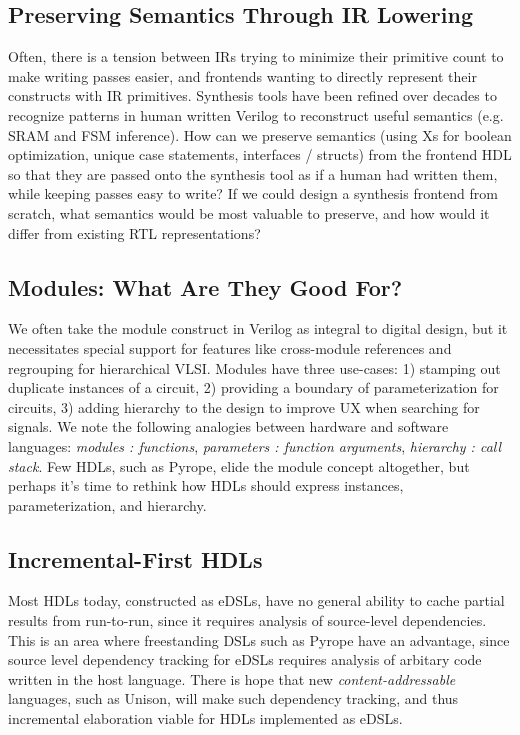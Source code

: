 \documentclass[sigplan,review,nonacm,10pt]{acmart}
\begin{document}
\subsection{Preserving Semantics Through IR Lowering}


Often, there is a tension between IRs trying to minimize their primitive count to make writing passes easier, and frontends wanting to directly represent their constructs with IR primitives.
Synthesis tools have been refined over decades to recognize patterns in human written Verilog to reconstruct useful semantics (e.g. SRAM and FSM inference).
How can we preserve semantics (using Xs for boolean optimization, unique case statements, interfaces / structs) from the frontend HDL so that they are passed onto the synthesis tool as if a human had written them, while keeping passes easy to write?
If we could design a synthesis frontend from scratch, what semantics would be most valuable to preserve, and how would it differ from existing RTL representations?

\subsection{Modules: What Are They Good For?}

We often take the module construct in Verilog as integral to digital design, but it necessitates special support for features like cross-module references and regrouping for hierarchical VLSI.
Modules have three use-cases: 1) stamping out duplicate instances of a circuit, 2) providing a boundary of parameterization for circuits, 3) adding hierarchy to the design to improve UX when searching for signals.
We note the following analogies between hardware and software languages: \textit{modules : functions}, \textit{parameters : function arguments}, \textit{hierarchy : call stack}.
Few HDLs, such as Pyrope\cite{pyrope}, elide the module concept altogether, but perhaps it's time to rethink how HDLs should express instances, parameterization, and hierarchy.

\subsection{Incremental-First HDLs}

Most HDLs today, constructed as eDSLs, have no general ability to cache partial results from run-to-run, since it requires analysis of source-level dependencies.
This is an area where freestanding DSLs such as Pyrope have an advantage, since source level dependency tracking for eDSLs requires analysis of arbitary code written in the host language.
There is hope that new \textit{content-addressable} languages, such as Unison\cite{unison}, will make such dependency tracking, and thus incremental elaboration viable for HDLs implemented as eDSLs.
\end{document}

